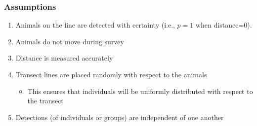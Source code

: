 \documentclass[color=usenames,dvipsnames]{beamer}\usepackage[]{graphicx}\usepackage[]{color}
\begin{document}












\begin{frame}
  \frametitle{Assumptions}
  \large
  \begin{enumerate}[<+- | visible@+->][\bf (1)]%
    \item Animals on the line are detected with certainty (i.e., $p=1$ when distance=0).
    \item Animals do not move during survey
    \item Distance is measured accurately
    \item Transect lines are placed randomly with respect to the animals
      \begin{itemize}
        \large
        \item This ensures that individuals will be uniformly
          distributed with respect to the transect
      \end{itemize}
    \item Detections (of individuals or groups) are independent of one another
  \end{enumerate}
\end{frame}
\end{document}
